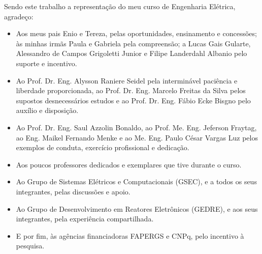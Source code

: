 Sendo este trabalho a representação do meu curso de Engenharia Elétrica, agradeço:

\begin{itemize}[label=-, labelwidth=6pt, itemindent=\parindent, listparindent=0pt, topsep=0pt, partopsep=0pt, parsep=0pt, itemsep=0pt, leftmargin=0pt, rightmargin=0pt]
	\item Aos meus pais Enio e Tereza, pelas oportunidades, ensinamento e concessões; às minhas irmãs Paula e Gabriela pela compreensão; a Lucas Gais Gularte, Alessandro de Campos Grigoletti Junior e Filipe Landerdahl Albanio pelo suporte e incentivo.
	\item Ao Prof. Dr. Eng. Alysson Raniere Seidel pela interminável paciência e liberdade proporcionada, ao Prof. Dr. Eng. Marcelo Freitas da Silva pelos supostos desnecessários estudos e ao Prof. Dr. Eng. Fábio Ecke Bisgno pelo auxílio e disposição.
	\item Ao Prof. Dr. Eng. Saul Azzolin Bonaldo, ao Prof. Me. Eng. Jeferson Fraytag, ao Eng. Maikel Fernando Menke e ao Me. Eng. Paulo César Vargas Luz pelos exemplos de conduta, exercício profissional e dedicação.
	\item Aos poucos professores dedicados e exemplares que tive durante o curso.
	\item Ao Grupo de Sistemas Elétricos e Computacionais (GSEC), e a todos os seus integrantes, pelas discussões e apoio.
	\item Ao Grupo de Desenvolvimento em Reatores Eletrônicos (GEDRE), e aos seus integrantes, pela experiência compartilhada.
	\item E por fim, às agências financiadoras FAPERGS e CNPq, pelo incentivo à pesquisa.
\end{itemize}